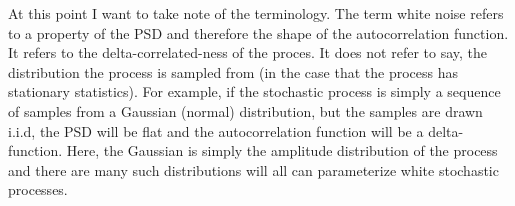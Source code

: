 \documentclass{article}
\begin{document}
At this point I want to take note of the terminology. The term white noise refers to a property of the PSD and therefore the shape of the autocorrelation function. It refers to the delta-correlated-ness of the proces. It does not refer to say, the distribution the process is sampled from (in the case that the process has stationary statistics). For example, if the stochastic process is simply a sequence of samples from a Gaussian (normal) distribution, but the samples are drawn i.i.d, the PSD will be flat and the autocorrelation function will be a delta-function. Here, the Gaussian is simply the amplitude distribution of the process and there are many such distributions will all can parameterize white stochastic processes. 
\end{document}
